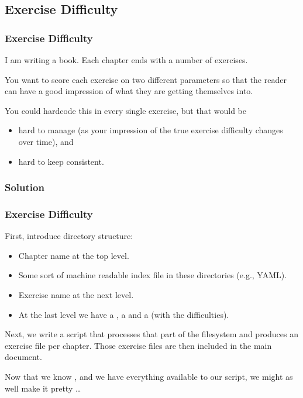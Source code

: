 {\subsection{Exercise Difficulty}
\begin{frame}[fragile]
  \frametitle{Exercise Difficulty}
  \pause
  \vspace{3mm}
  I am writing a book. Each chapter ends with a number of exercises.
  
  \vspace{5mm}
  You want to score each exercise on two different parameters so that the reader can have a good impression of what they are getting themselves into.
  
  \pause
  \vspace{5mm}
  You could hardcode this in every single exercise, but that would be
  \begin{itemize}
    \item hard to manage (as your impression of the true exercise difficulty changes over time), and
    \item hard to keep consistent.
  \end{itemize}
\end{frame}

\subsubsection{Solution}
\begin{frame}[fragile]
  \frametitle{Exercise Difficulty }
  \pause
  \vspace{3mm}
  First, introduce directory structure:
  \begin{itemize}
    \item Chapter name at the top level.
    \item Some sort of machine readable index file in these directories (e.g., YAML).
    \item Exercise name at the next level.
    \item At the last level we have a , a  and a  (with the difficulties).
  \end{itemize}
  
  \pause
  \vspace{5mm}
  Next, we write a script that processes that part of the filesystem and produces an exercise file per chapter. Those exercise files are then included in the main document.
  
  \vspace{5mm}
  Now that we know \TikZ, and we have everything available to our script, we might as well make it pretty \ldots
\end{frame}

}
